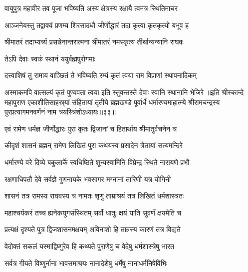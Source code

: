 \twolineshloka
{वायुपुत्र महावीर तव पूजा भविष्यति}
{अस्य क्षेत्रस्य रक्षायै त्वमत्र स्थितिमाचर}%

\twolineshloka
{आञ्जनेयस्तु तद्वाक्यं प्रणम्य शिरसादधौ}
{जीर्णोद्धारं तदा कृत्वा कृतकृत्यो बभूव ह}%

\twolineshloka
{श्रीमातरं तदाभ्यर्च्य प्रसन्नेनान्तरात्मना}
{श्रीमातरं नमस्कृत्य तीर्थान्यन्यानि राघवः}%

\onelineshloka
{तेऽपि देवाः स्वकं स्थानं ययुर्बह्मपुरोगमाः}%

\twolineshloka
{दत्त्वाशिषं तु रामाय वाञ्छितं ते भविष्यति}
{रम्यं कृतं त्वया राम विप्राणां स्थापनादिकम्}%

\twolineshloka
{अस्माकमपि वात्सल्यं कृतं पुण्यवता त्वया}
{इति स्तुवन्तस्ते देवाः स्वानि स्थानानि भेजिरे}%
॥इति श्रीस्कान्दे महापुराण एकाशीतिसाहस्र्यां संहितायां तृतीये ब्रह्मखण्डे पूर्वार्धे धर्मारण्यमाहात्म्ये श्रीरामचन्द्रस्य पुरप्रत्यागमनवर्णनं नाम त्रयस्त्रिंशोऽध्यायः॥३३॥

\resetShloka


\twolineshloka
{एवं रामेण धर्मज्ञ जीर्णोद्धारः पुरा कृतः}
{द्विजानां च हितार्थाय श्रीमातुर्वचनेन च}%


\twolineshloka
{कीदृशं शासनं ब्रह्मन् रामेण लिखितं पुरा}
{कथयस्व प्रसादेन त्रेतायां सत्यमन्दिरे}%


\twolineshloka
{धर्मारण्ये वरे दिव्ये बकुलार्के स्वधिष्ठिते}
{शून्यस्वामिनि विप्रेन्द्र स्थिते नारायणे प्रभौ}%

\twolineshloka
{रक्षणाधिपतौ देवे सर्वज्ञे गुणनायके}
{भवसागर मग्नानां तारिणी यत्र योगिनी}%

\twolineshloka
{शासनं तत्र रामस्य राघवस्य च नामतः}
{शृणु ताम्राश्रयं तत्र लिखितं धर्मशास्त्रतः}%

\twolineshloka
{महाश्चर्यकरं तच्च ह्यनेकयुगसंस्थितम्}
{सर्वो धातुः क्षयं याति सुवर्णं क्षयमेति च}%

\twolineshloka
{प्रत्यक्षं दृश्यते पुत्र द्विजशासनमक्षयम्}
{अविनाशो हि ताम्रस्य कारणं तत्र विद्यते}%

\twolineshloka
{वेदोक्तं सकलं यस्माद्विष्णुरेव हि कथ्यते}
{पुराणेषु च वेदेषु धर्मशास्त्रेषु भारत}%

\twolineshloka
{सर्वत्र गीयते विष्णुर्नाना भावसमाश्रयः}
{नानादेशेषु धर्मेषु नानाधर्मनिषेविभिः}%


